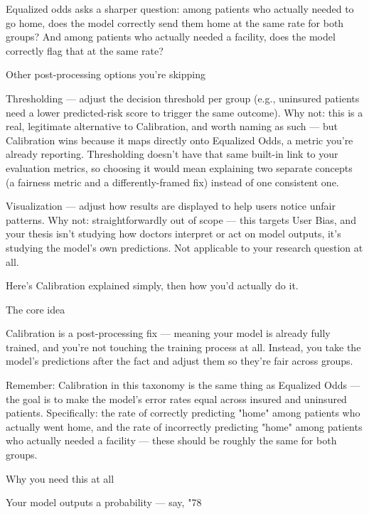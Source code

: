 \documentclass[authoryear,preprint,12pt]{elsarticle}
\begin{document}
Equalized odds asks a sharper question: among patients who actually needed to go home, does the model correctly send them home at the same rate for both groups? And among patients who actually needed a facility, does the model correctly flag that at the same rate?

Other post-processing options you're skipping

Thresholding — adjust the decision threshold per group (e.g., uninsured patients need a lower predicted-risk score to trigger the same outcome).
Why not: this is a real, legitimate alternative to Calibration, and worth naming as such — but Calibration wins because it maps directly onto Equalized Odds, a metric you're already reporting. Thresholding doesn't have that same built-in link to your evaluation metrics, so choosing it would mean explaining two separate concepts (a fairness metric and a differently-framed fix) instead of one consistent one.

Visualization — adjust how results are displayed to help users notice unfair patterns.
Why not: straightforwardly out of scope — this targets User Bias, and your thesis isn't studying how doctors interpret or act on model outputs, it's studying the model's own predictions. Not applicable to your research question at all.

Here's Calibration explained simply, then how you'd actually do it.

The core idea

Calibration is a post-processing fix — meaning your model is already fully trained, and you're not touching the training process at all. Instead, you take the model's predictions after the fact and adjust them so they're fair across groups.

Remember: Calibration in this taxonomy is the same thing as Equalized Odds — the goal is to make the model's error rates equal across insured and uninsured patients. Specifically: the rate of correctly predicting "home" among patients who actually went home, and the rate of incorrectly predicting "home" among patients who actually needed a facility — these should be roughly the same for both groups.

Why you need this at all

Your model outputs a probability — say, "78%
\end{document}
